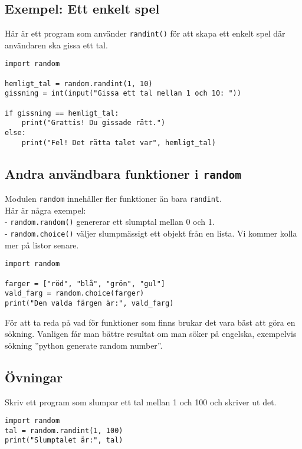 \subsection{Exempel: Ett enkelt spel}
Här är ett program som använder \texttt{randint()} för att skapa ett enkelt spel där användaren ska gissa ett tal.

\begin{lstlisting}[title=Gissa ett tal-spel]
import random

hemligt_tal = random.randint(1, 10)
gissning = int(input("Gissa ett tal mellan 1 och 10: "))

if gissning == hemligt_tal:
    print("Grattis! Du gissade rätt.")
else:
    print("Fel! Det rätta talet var", hemligt_tal)
\end{lstlisting}

\subsection{Andra användbara funktioner i \texttt{random}}
Modulen \texttt{random} innehåller fler funktioner än bara \texttt{randint}. \\
Här är några exempel:\\
- \texttt{random.random()} genererar ett slumptal mellan 0 och 1.\\
- \texttt{random.choice()} väljer slumpmässigt ett objekt från en lista. 
Vi kommer kolla mer på listor senare. \\

\begin{lstlisting}[title=Exempel med \texttt{random.choice()}]
import random

farger = ["röd", "blå", "grön", "gul"]
vald_farg = random.choice(farger)
print("Den valda färgen är:", vald_farg)
\end{lstlisting}

För att ta reda på vad för funktioner som finns brukar det vara bäst att göra en sökning.
Vanligen får man bättre resultat om man söker på engelska, exempelvis sökning ''python generate random number''.

\subsection{Övningar}
\begin{exercise}
Skriv ett program som slumpar ett tal mellan 1 och 100 och skriver ut det.
\end{exercise}

\begin{solution}
\begin{lstlisting}
import random
tal = random.randint(1, 100)
print("Slumptalet är:", tal)
\end{lstlisting}
\end{solution}

